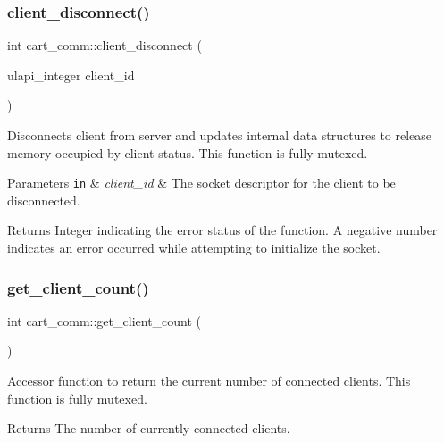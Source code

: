 \subsubsection{\texorpdfstring{client\+\_\+disconnect()}{client\_disconnect()}}
{\footnotesize\ttfamily int cart\+\_\+comm\+::client\+\_\+disconnect (\begin{DoxyParamCaption}\item[{ulapi\+\_\+integer}]{client\+\_\+id }\end{DoxyParamCaption})}

Disconnects client from server and updates internal data structures to release memory occupied by client status. This function is fully mutexed. 
\begin{DoxyParams}[1]{Parameters}
\mbox{\tt in}  & {\em client\+\_\+id} & The socket descriptor for the client to be disconnected. \\
\hline
\end{DoxyParams}
\begin{DoxyReturn}{Returns}
Integer indicating the error status of the function. A negative number indicates an error occurred while attempting to initialize the socket. 
\end{DoxyReturn}
\mbox{\label{classcart__comm_a33db5a17772cf87452ebdfae4547e152}} 
\subsubsection{\texorpdfstring{get\+\_\+client\+\_\+count()}{get\_client\_count()}}
{\footnotesize\ttfamily int cart\+\_\+comm\+::get\+\_\+client\+\_\+count (\begin{DoxyParamCaption}{ }\end{DoxyParamCaption})}

Accessor function to return the current number of connected clients. This function is fully mutexed. \begin{DoxyReturn}{Returns}
The number of currently connected clients. 
\end{DoxyReturn}
\mbox{\label{classcart__comm_a9f5d2a267cb9dd82603cea7656ad57fc}} 
